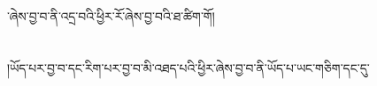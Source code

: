 ་ཞེས་བྱ་བ་ནི་འདྲ་བའི་ཕྱིར་རོ་ཞེས་བྱ་བའི་ཐ་ཚིག་གོ།\chapter{ }།ཡོད་པར་བྱ་བ་དང་རིག་པར་བྱ་བ་མི་འཐད་པའི་ཕྱིར་ཞེས་བྱ་བ་ནི་ཡོད་པ་ཡང་གཅིག་དང་དུ་